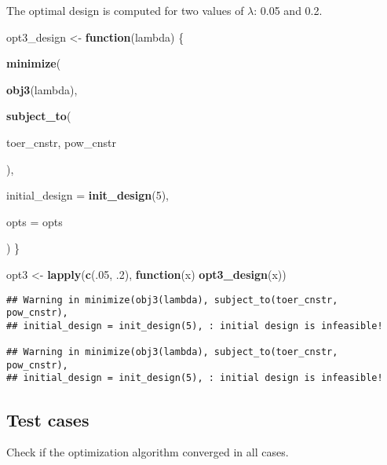 \documentclass[]{book}
\newenvironment{Shaded}{\begin{snugshade}}{\end{snugshade}}
\newcommand{\ControlFlowTok}[1]{\textcolor[rgb]{0.13,0.29,0.53}{\textbf{#1}}}
\newcommand{\DataTypeTok}[1]{\textcolor[rgb]{0.13,0.29,0.53}{#1}}
\newcommand{\DecValTok}[1]{\textcolor[rgb]{0.00,0.00,0.81}{#1}}
\newcommand{\FloatTok}[1]{\textcolor[rgb]{0.00,0.00,0.81}{#1}}
\newcommand{\KeywordTok}[1]{\textcolor[rgb]{0.13,0.29,0.53}{\textbf{#1}}}
\newcommand{\NormalTok}[1]{#1}
\newcommand{\OperatorTok}[1]{\textcolor[rgb]{0.81,0.36,0.00}{\textbf{#1}}}
\newcommand{\StringTok}[1]{\textcolor[rgb]{0.31,0.60,0.02}{#1}}
\begin{document}
The optimal design is computed for two values of \(\lambda\): 0.05 and 0.2.

\begin{Shaded}
\begin{Highlighting}[]
\NormalTok{opt3_design <-}\StringTok{ }\ControlFlowTok{function}\NormalTok{(lambda) \{}

    \KeywordTok{minimize}\NormalTok{(}
        
        \KeywordTok{obj3}\NormalTok{(lambda),}
        
        \KeywordTok{subject_to}\NormalTok{(}
            
\NormalTok{            toer_cnstr,}
\NormalTok{            pow_cnstr}

\NormalTok{        ),}
        
        \DataTypeTok{initial_design =} \KeywordTok{init_design}\NormalTok{(}\DecValTok{5}\NormalTok{),}
        
        \DataTypeTok{opts =}\NormalTok{ opts}
        
\NormalTok{)}
\NormalTok{\}}

\NormalTok{opt3 <-}\StringTok{ }\KeywordTok{lapply}\NormalTok{(}\KeywordTok{c}\NormalTok{(.}\DecValTok{05}\NormalTok{, }\FloatTok{.2}\NormalTok{), }\ControlFlowTok{function}\NormalTok{(x) }\KeywordTok{opt3_design}\NormalTok{(x))}
\end{Highlighting}
\end{Shaded}

\begin{verbatim}
## Warning in minimize(obj3(lambda), subject_to(toer_cnstr, pow_cnstr),
## initial_design = init_design(5), : initial design is infeasible!

## Warning in minimize(obj3(lambda), subject_to(toer_cnstr, pow_cnstr),
## initial_design = init_design(5), : initial design is infeasible!
\end{verbatim}

\hypertarget{test-cases-12}{%
\subsection{Test cases}\label{test-cases-12}}

Check if the optimization algorithm converged in all cases.

\begin{Shaded}
\end{Shaded}
\end{document}

